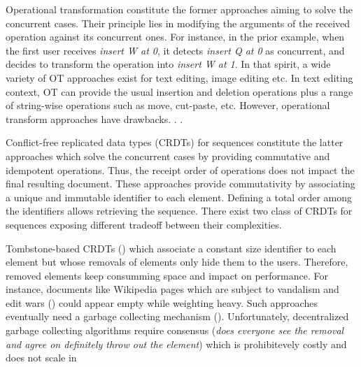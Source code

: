 \begin{asparadesc}


\item [Operational transformation] constitute the former approaches aiming to
  solve the concurrent cases. Their principle lies in modifying the arguments of
  the received operation against its concurrent ones. For instance, in the prior
  example, when the first user receives \emph{insert W at 0}, it detects
  \emph{insert Q at 0} as concurrent, and decides to transform the operation
  into \emph{insert W at 1}.  In that spirit, a wide variety of OT approaches
  exist for text editing, image editing etc. In text editing context, OT can
  provide the usual insertion and deletion operations plus a range of
  string-wise operations such as move, cut-paste, etc. However, operational
  transform approaches have drawbacks. . .
\item [Conflict-free replicated data types] (CRDTs) for sequences constitute the
  latter approaches which solve the concurrent cases by providing commutative
  and idempotent operations. Thus, the receipt order of operations does not
  impact the final resulting document. These approaches provide commutativity by
  associating a unique and immutable identifier to each element. Defining a
  total order among the identifiers allows retrieving the sequence. There exist
  two class of CRDTs for sequences exposing different tradeoff between their
  complexities.
\item [Tombstone-based] CRDTs () which associate a constant size
  identifier to each element but whose removals of elements only hide them to
  the users. Therefore, removed elements keep consumming space and impact on
  performance. For instance, documents like Wikipedia pages which are subject to
  vandalism and edit wars () could appear empty while weighting
  heavy. Such approaches eventually need a garbage collecting mechanism
  ().  Unfortunately, decentralized garbage collecting algorithms
  require consensus (\emph{does everyone see the removal and agree on definitely
    throw out the element}) which is prohibitevely costly and does not scale in

\end{asparadesc}
